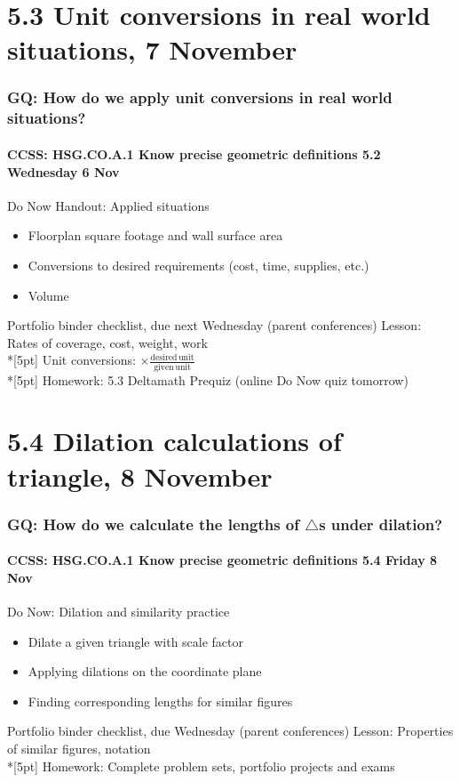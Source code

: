 \documentclass{beamer}
\begin{document}
\section{5.3 Unit conversions in real world situations, 7 November}
\frame
{
  \frametitle{GQ: How do we apply unit conversions in real world situations?}
  \framesubtitle{CCSS: HSG.CO.A.1 Know precise geometric definitions \hfill \alert{5.2 Wednesday 6 Nov}}

  \begin{block}{Do Now Handout: Applied situations}
  \begin{itemize}
    \item Floorplan square footage and wall surface area
    \item Conversions to desired requirements (cost, time, supplies, etc.)
    \item Volume
  \end{itemize}
  \end{block}
  Portfolio binder checklist, due next Wednesday (parent conferences)
  Lesson: Rates of coverage, cost, weight, work \\*[5pt]
  Unit conversions: $\displaystyle \times \frac{\mathrm{desired}\, \mathrm{unit}}{\mathrm{given}\, \mathrm{unit}}$ \\*[5pt]
  Homework: 5.3 Deltamath Prequiz (online Do Now quiz tomorrow)
}

\section{5.4 Dilation calculations of triangle, 8 November}
\frame
{
  \frametitle{GQ: How do we calculate the lengths of $\triangle$s under dilation?}
  \framesubtitle{CCSS: HSG.CO.A.1 Know precise geometric definitions \hfill \alert{5.4 Friday 8 Nov}}

  \begin{block}{Do Now: Dilation and similarity practice}
  \begin{itemize}
    \item Dilate a given triangle with scale factor
    \item Applying dilations on the coordinate plane
    \item Finding corresponding lengths for similar figures
  \end{itemize}
  \end{block}
  Portfolio binder checklist, due Wednesday (parent conferences)
  Lesson: Properties of similar figures, notation\\*[5pt]
  Homework: Complete problem sets, portfolio projects and exams
}
\end{document}
